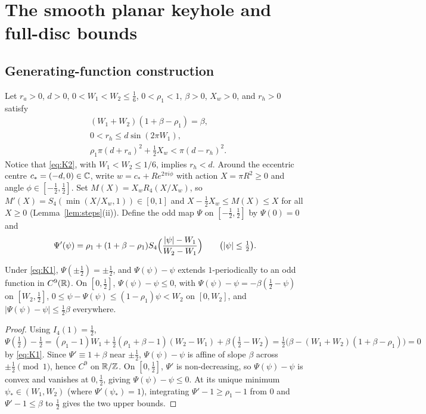 \section{The smooth planar keyhole and full-disc bounds}\label{sec:keyhole}

\subsection{Generating-function construction}\label{sec:kh-def}

Let $r_a>0$, $d>0$, $0<W_1<W_2\le\frac16$, $0<\rho_1<1$, $\beta>0$, $X_w>0$, and $r_h>0$ satisfy
\begin{subequations}\label{eq:K123}
\begin{align}
 &(W_1+W_2)(1+\beta-\rho_1)=\beta,\label{eq:K1}\\
 &0<r_h\le d\sin(2\pi W_1),\label{eq:K2}\\
 &\rho_1\pi(d+r_a)^2 + \frac12 X_w < \pi(d-r_h)^2.\label{eq:K3}
\end{align}
\end{subequations}
Notice that \eqref{eq:K2}, with $W_1<W_2\le1/6$, implies $r_h<d$. Around the eccentric centre $c_*=(-d,0)\in\mathbb{C}$, write $w=c_*+Re^{2\pi i\phi}$
with action $X=\pi R^2\ge0$ and angle $\phi\in[-\frac12,\frac12]$. Set $M(X)=X_w R_4(X/X_w)$, so $M'(X)=S_4(\min(X/X_w,1))\in[0,1]$
and $X-\frac12X_w\le M(X)\le X$ for all $X\ge0$ (Lemma~\ref{lem:steps}(ii)). Define the odd map $\Psi$ on
$[-\frac12,\frac12]$ by $\Psi(0)=0$ and
\[
 \Psi'(\psi)=\rho_1+(1+\beta-\rho_1)S_4\Bigl(\frac{|\psi|-W_1}{W_2-W_1}\Bigr)\qquad\bigl(|\psi|\le\tfrac12\bigr).
\]

\begin{lemma}\label{lem:psi}
Under \eqref{eq:K1}, $\Psi(\pm\frac12)=\pm\frac12$, and $\Psi(\psi)-\psi$ extends $1$-periodically to an odd function in
$C^9(\mathbb{R})$. On $[0,\frac12]$, $\Psi(\psi)-\psi\le0$, with $\Psi(\psi)-\psi=-\beta(\frac12-\psi)$ on $[W_2,\frac12]$,
$0\le\psi-\Psi(\psi)\le(1-\rho_1)\psi<W_2$ on $[0,W_2]$, and $|\Psi(\psi)-\psi|\le\frac12\beta$ everywhere.
\end{lemma}

\begin{proof}
Using $I_4(1)=\frac12$, $\Psi(\frac12)-\frac12=(\rho_1-1)W_1+\frac12(\rho_1+\beta-1)(W_2-W_1)+\beta(\frac12-W_2)
=\frac12\bigl(\beta-(W_1+W_2)(1+\beta-\rho_1)\bigr)=0$ by \eqref{eq:K1}. Since $\Psi' \equiv 1+\beta$ near $\pm\frac12$,
$\Psi(\psi)-\psi$ is affine of slope $\beta$ across $\pm\frac12\pmod1$, hence $C^9$ on $\mathbb{R}/\mathbb{Z}$. On $[0,\frac12]$,
$\Psi'$ is non-decreasing, so $\Psi(\psi)-\psi$ is convex and vanishes at $0,\frac12$, giving $\Psi(\psi)-\psi\le0$. At
its unique minimum $\psi_*\in(W_1,W_2)$ (where $\Psi'(\psi_*)=1$), integrating $\Psi'-1\ge\rho_1-1$ from $0$ and
$\Psi'-1\le\beta$ to $\frac12$ gives the two upper bounds.
\end{proof}

